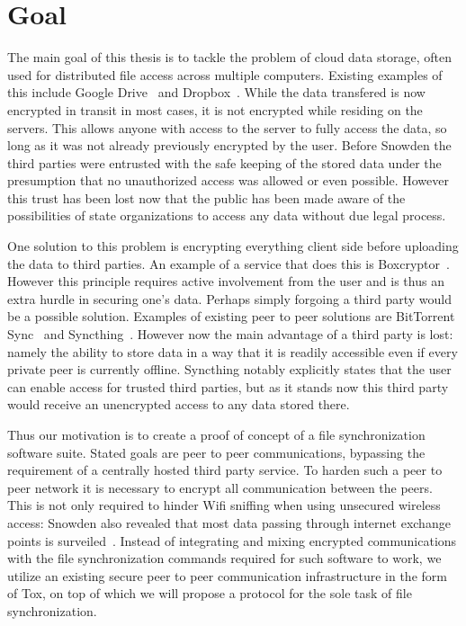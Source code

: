 \section{Goal}
\label{sec:Goal}

The main goal of this thesis is to tackle the problem of cloud data storage, often used for distributed file access across multiple computers.
Existing examples of this include Google Drive~\cite{web:site:gdrive} and Dropbox~\cite{web:site:dropbox}.
While the data transfered is now encrypted in transit in most cases, it is not encrypted while residing on the servers.
This allows anyone with access to the server to fully access the data, so long as it was not already previously encrypted by the user.
Before Snowden the third parties were entrusted with the safe keeping of the stored data under the presumption that no unauthorized access was allowed or even possible.
However this trust has been lost now that the public has been made aware of the possibilities of state organizations to access any data without due legal process.

One solution to this problem is encrypting everything client side before uploading the data to third parties.
An example of a service that does this is Boxcryptor~\cite{web:site:boxcryptor}.
However this principle requires active involvement from the user and is thus an extra hurdle in securing one's data.
Perhaps simply forgoing a third party would be a possible solution.
Examples of existing peer to peer solutions are BitTorrent Sync~\cite{web:site:bittorrent_sync} and Syncthing~\cite{web:site:synthing}.
However now the main advantage of a third party is lost: namely the ability to store data in a way that it is readily accessible even if every private peer is currently offline.
Syncthing notably explicitly states that the user can enable access for trusted third parties, but as it stands now this third party would receive an unencrypted access to any data stored there.

Thus our motivation is to create a proof of concept of a file synchronization software suite.
Stated goals are peer to peer communications, bypassing the requirement of a centrally hosted third party service.
To harden such a peer to peer network it is necessary to encrypt all communication between the peers.
This is not only required to hinder Wifi sniffing when using unsecured wireless access: Snowden also revealed that most data passing through internet exchange points is surveiled~\cite{web:site:heise:decix}.
Instead of integrating and mixing encrypted communications with the file synchronization commands required for such software to work, we utilize an existing secure peer to peer communication infrastructure in the form of Tox, on top of which we will propose a protocol for the sole task of file synchronization.

